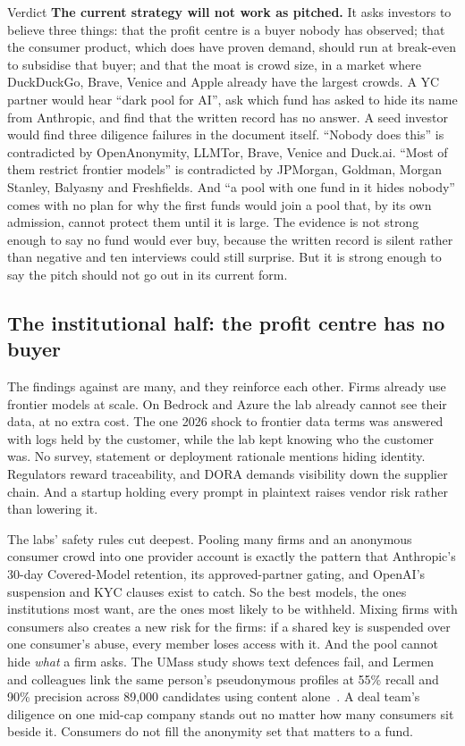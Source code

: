 \documentclass[10pt,a4paper]{article}
\begin{document}
\begin{callout}[coral]{Verdict}
\textbf{The current strategy will not work as pitched.} It asks investors to believe three things: that the profit centre is a buyer nobody has observed; that the consumer product, which does have proven demand, should run at break-even to subsidise that buyer; and that the moat is crowd size, in a market where DuckDuckGo, Brave, Venice and Apple already have the largest crowds. A YC partner would hear ``dark pool for AI'', ask which fund has asked to hide its name from Anthropic, and find that the written record has no answer. A seed investor would find three diligence failures in the document itself. ``Nobody does this'' is contradicted by OpenAnonymity, LLMTor, Brave, Venice and Duck.ai. ``Most of them restrict frontier models'' is contradicted by JPMorgan, Goldman, Morgan Stanley, Balyasny and Freshfields. And ``a pool with one fund in it hides nobody'' comes with no plan for why the first funds would join a pool that, by its own admission, cannot protect them until it is large. The evidence is not strong enough to say no fund would ever buy, because the written record is silent rather than negative and ten interviews could still surprise. But it is strong enough to say the pitch should not go out in its current form.
\end{callout}

\subsection{The institutional half: the profit centre has no buyer}

The findings against are many, and they reinforce each other. Firms already use frontier models at scale. On Bedrock and Azure the lab already cannot see their data, at no extra cost. The one 2026 shock to frontier data terms was answered with logs held by the customer, while the lab kept knowing who the customer was. No survey, statement or deployment rationale mentions hiding identity. Regulators reward traceability, and DORA demands visibility down the supplier chain. And a startup holding every prompt in plaintext raises vendor risk rather than lowering it.

The labs' safety rules cut deepest. Pooling many firms and an anonymous consumer crowd into one provider account is exactly the pattern that Anthropic's 30-day Covered-Model retention, its approved-partner gating, and OpenAI's suspension and KYC clauses exist to catch. So the best models, the ones institutions most want, are the ones most likely to be withheld. Mixing firms with consumers also creates a new risk for the firms: if a shared key is suspended over one consumer's abuse, every member loses access with it. And the pool cannot hide \emph{what} a firm asks. The UMass study shows text defences fail, and Lermen and colleagues link the same person's pseudonymous profiles at 55\% recall and 90\% precision across 89,000 candidates using content alone~\cite{arxiv-2602-16800-lermen}. A deal team's diligence on one mid-cap company stands out no matter how many consumers sit beside it. Consumers do not fill the anonymity set that matters to a fund.
\end{document}
